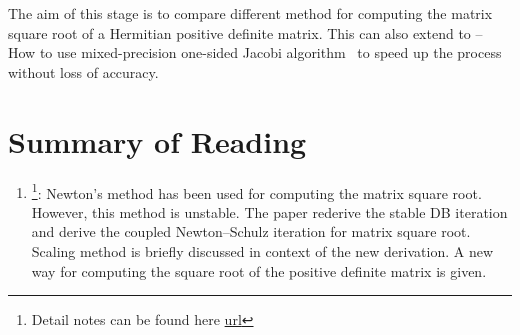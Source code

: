 \documentclass{article}
\begin{document}
The aim of this stage is to compare different method for computing the
matrix square root of a Hermitian positive definite matrix. This can also
extend to -- How to use mixed-precision one-sided Jacobi
algorithm~\cite{gms22} to speed up the process without loss of accuracy.



\section{Summary of Reading}
\label{sec:summary-reading}

\begin{enumerate}
\item \cite{high97}\footnote{Detail notes can be found here
  \href{https://github.com/zhengbo0503/reading_notes/blob/main/high97/do.pdf}{url}}: 
  Newton's method has been used for computing the matrix  
  square root. However, this method is unstable. The paper rederive the
  stable DB iteration and derive the coupled Newton--Schulz iteration for
  matrix square root. Scaling method is briefly discussed in context of the
  new derivation. A new way for computing the square root of the positive
  definite matrix is given. 
\end{enumerate}







\newpage

 
\end{document}
